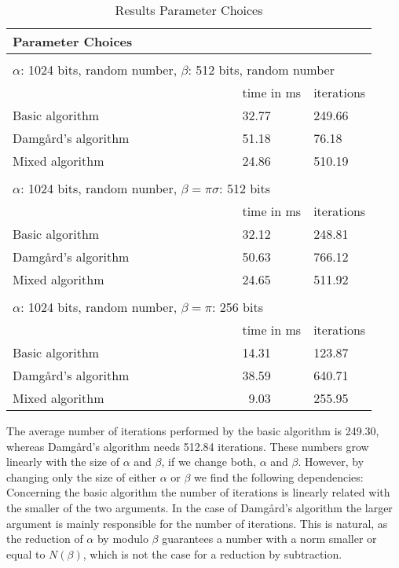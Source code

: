 \documentclass[a4paper, 11pt]{article}
\begin{document}
 \begin{table}[htb] 
 \centering 
 \begin{tabular}{l l l} 
 \hline 
 \multicolumn{3}{l}{Parameter Choices}\\ 
 \hline 
 \multicolumn{3}{l}{}\\ 
 \multicolumn{3}{l}{$\alpha$: 1024 bits, random number, $\beta$: 512 bits, random number}\\ 
 \hline 
  & time in ms & iterations\\ 
 \hline 
 Basic algorithm & 32.77 & 249.66\\ 
 Damg\aa rd's algorithm  & 51.18  & 76.18\\ 
 Mixed algorithm & 24.86 & 510.19\\ 
 \hline 
 \multicolumn{3}{l}{}\\ 
 \multicolumn{3}{l}{$\alpha$: 1024 bits, random number, $\beta = \pi \sigma$: 512 bits}\\ 
 \hline 
  & time in ms&iterations\\ 
 \hline 
 Basic algorithm & 32.12 & 248.81\\ 
 Damg\aa rd's algorithm  & 50.63 & 766.12\\ 
 Mixed algorithm &24.65& 511.92\\ 
 \hline\multicolumn{3}{l}{}\\ 
 \multicolumn{3}{l}{$\alpha$: 1024 bits, random number, $\beta = \pi$: 256 bits}\\ 
 \hline 
  & time in ms&iterations\\ 
 \hline 
 Basic algorithm & 14.31 & 123.87\\ 
 Damg\aa rd's algorithm~~~~~~~~~~~~~~~~  & 38.59 & 640.71\\ 
 Mixed algorithm & ~9.03 & 255.95\\ 
 \hline 
 \end{tabular} 
 \caption{Results Parameter Choices} 
         \label{tab:mova} 
 \end{table} 
 
 The average number of iterations performed by the basic algorithm is 249.30, whereas Damg\aa rd's algorithm needs 512.84 iterations. These numbers grow linearly with the size of $\alpha$ and $\beta$, if we change both, $\alpha$ and $\beta$. However, by changing only the size of either   $\alpha$ or $\beta$ we find the following dependencies: Concerning the basic algorithm the number of iterations is linearly related with the smaller of the two arguments. In the case of Damg\aa rd's algorithm the larger argument is mainly responsible for the number of iterations. This is natural, as the reduction of $\alpha$ by modulo $\beta$ guarantees a number with a norm smaller or equal to $N(\beta)$, which is not the case for a reduction by subtraction. 
 
\end{document}

